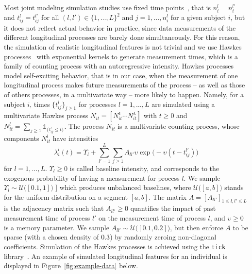 \documentclass[11pt]{article}
\newcommand{\ind}[1]{\mathds{1}_{#1}}
\newcommand{\cU}{\mathcal U}
\begin{document}
Most joint modeling simulation studies use fixed time points~\citep{hickey2018joinerml}, that is $n_i^l = n_i^{l'}$ and $t_{ij}^l = t_{ij}^{l'}$ for all $(l, l') \in \{1, \ldots, L\}^2$ and $j = 1, \ldots, n_i^l$ for a given subject $i$, but it does not reflect actual behavior in practice, since data measurements of the different longitudinal processes are barely done simultaneously. For this reason, the simulation of realistic longitudinal features is not trivial and we use Hawkes processes~\citep{hawkes1974cluster} with exponential kernels to generate measurement times, which is a family of counting process with an autoregressive intensity. 
Hawkes processes model self-exciting behavior, that is in our case, when the measurement of one longitudinal process makes future measurements of the process -- as well as those of others processes, in a multivariate way -- more likely to happen.
Namely, for a subject $i$, times $\{t_{ij}^l\}_{j \geq 1}$ for processes $l=1, \ldots, L$ are simulated using a multivariate Hawkes process $N_{it} = [N_{it}^1 \cdots N_{it}^L]$ with $t \geq 0$ and $N_{it}^l = \sum_{j \geq 1} \ind{\{t_{ij}^l \leq t\}}$. The process $N_{it}$ is a multivariate counting process, whose components $N_{it}^l$ have intensities
\[ \lambda_i^l(t) = \Upsilon_{l} + \sum_{l'=1}^L \sum_{j \geq 1} A_{ll'} \upsilon \exp\big(-\upsilon(t - t_{ij}^{l'}) \big) \]
for $l=1, \ldots, L$. $\Upsilon_{l} \geq 0$ is called baseline intensity, and corresponds to the exogenous probability of having a measurement for process $l$. We sample $\Upsilon_{l} \sim \cU\big([0.1,1]\big)$ ] which produces unbalanced baselines, where $\cU\big([a,b]\big)$ stands for the uniform distribution on a segment $[a,b]$.
The matrix $A = [A_{ll'}]_{1 \leq l,l' \leq L}$ is the adjacency matrix such that $A_{ll'} \geq 0$ quantifies the impact of past measurement time of process $l'$ on the measurement time of process $l$, and $\upsilon \geq 0$ is a memory parameter. We sample $A_{ll'} \sim \cU\big([0.1,0.2]\big)$, but then enforce $A$ to be sparse (with a chosen density of $0.3$) by randomly zeroing non-diagonal coefficients. Simulation of the Hawkes processes
is achieved using the \texttt{tick} library~\citep{bacry2017tick}. An example of simulated longitudinal features for an individual is displayed in Figure~\ref{fig:example-data} below. 
\end{document}
